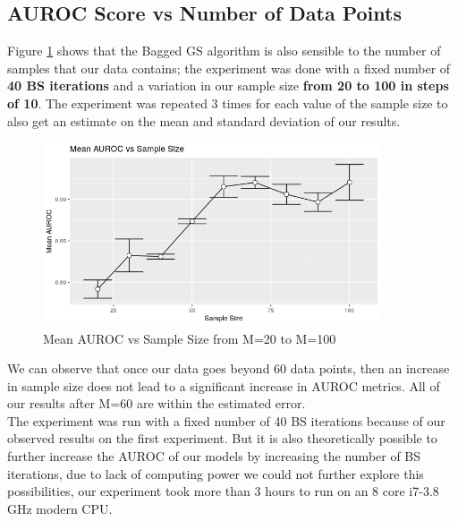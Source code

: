 \documentclass{article}
\begin{document}
	\subsection{AUROC Score vs Number of Data Points}
	Figure \ref{fig:auroc_sample_size} shows that the Bagged GS algorithm is also sensible to the number of
	samples that our data contains; the experiment was done with a fixed number
	of \textbf{40 BS iterations} and a variation in our sample size \textbf{from 20 to 100 in
	steps of 10}. The experiment was repeated 3 times for each value of the sample
	size to also get an estimate on the mean and standard deviation of our
	results.
	\begin{figure}[ht]
		\includegraphics[width=10cm]{auroc_sample_size}
		\centering
		\caption{Mean AUROC vs Sample Size from M=20 to M=100}
		\label{fig:auroc_sample_size}
	\end{figure}
	We can observe that once our data goes beyond 60 data points, then an
	increase in sample size does not lead to a significant increase in AUROC
	metrics. All of our results after M=60 are within the estimated error. \\
	The experiment was run with a fixed number of 40 BS iterations because of our
	observed results on the first experiment. But it is also theoretically
	possible to further increase the AUROC of our models by increasing the number
	of BS iterations, due to lack of computing power we could not further explore
	this possibilities, our experiment took more
	than 3 hours to run on an 8 core i7-3.8 GHz modern CPU.
\end{document}
